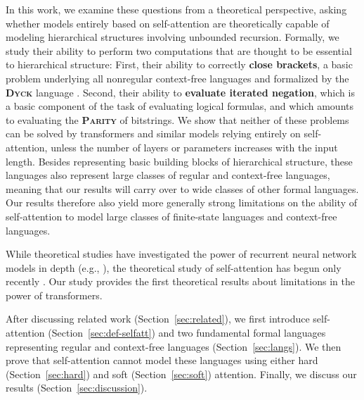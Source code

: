 \documentclass[11pt,a4paper]{article}
\newcommand{\key}[1]{\textbf{#1}}
\begin{document}
In this work, we examine these questions from a theoretical perspective, asking whether models entirely based on self-attention are theoretically capable of modeling hierarchical structures involving unbounded recursion.
Formally, we study their ability to perform two computations that are thought to be essential to hierarchical structure:
First, their ability to correctly \key{close brackets}, a basic problem underlying all nonregular context-free languages and formalized by the \key{\textsc{Dyck}} language \cite{chomsky1963algebraic}.
Second, their ability to \key{evaluate iterated negation}, which is a basic component of the task of evaluating logical formulas, and which amounts to evaluating the \key{\textsc{Parity}} of bitstrings.
We show that neither of these problems can be solved by transformers and similar models relying entirely on self-attention, unless the number of layers or parameters increases with the input length.
Besides representing basic building blocks of hierarchical structure, these languages also represent large classes of regular and context-free languages, meaning that our results will carry over to wide classes of other formal languages.
Our results therefore also yield more generally strong limitations on the ability of self-attention to model large classes of finite-state languages and context-free languages.

While theoretical studies have investigated the power of recurrent neural network models in depth (e.g., \citet{siegelman1991neural, bengio1994learning, weiss2018practical, miller2018recurrent, merrill2019sequential}), the theoretical study of self-attention has begun only recently \citep{perez2019turing}.
Our study provides the first theoretical results about limitations in the power of transformers.

After discussing related work (Section~\ref{sec:related}), we first introduce self-attention (Section~\ref{sec:def-selfatt}) and two fundamental formal languages representing regular and context-free languages (Section~\ref{sec:langs}).
We then prove that self-attention cannot model these languages using either hard (Section~\ref{sec:hard}) and soft (Section~\ref{sec:soft}) attention.
Finally, we discuss our results (Section~\ref{sec:discussion}).
\end{document}
